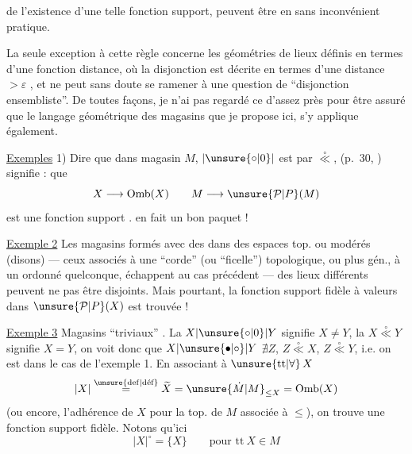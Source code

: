 de l'existence d'une telle fonction support, peuvent être  en  sans inconvénient pratique.

La seule exception à cette règle concerne les géométries de lieux définis  en termes d'une fonction distance, où la disjonction est décrite en termes d'une distance $>\varepsilon$ , et ne peut sans doute se ramener à une question de  ``disjonction ensembliste''. De toutes façons, je n'ai pas regardé ce  d'assez près pour être assuré que le langage géométrique des magasins que je propose ici, s'y applique également.

\uline{Exemples} 1)  Dire que dans  magasin $M$,  $\lvert\unsure{\circ|0}\rvert$ est  par $\overset{\circ}{\ll}$, (p.~30, ) signifie : que
\[
 X \longrightarrow \mathrm{Omb}(X) \qquad M \longrightarrow \unsure{\mathcal{P}|P}(M)
\]
est une fonction support .   en fait un bon paquet !



\uline{Exemple 2} Les magasins formés avec des   dans des espaces  top. ou modérés (disons) ---  ceux associés à une ``corde'' (ou ``ficelle'') topologique, ou plus gén., à un  ordonné quelconque, échappent au cas précédent --- des lieux différents peuvent ne pas être disjoints. Mais pourtant, la fonction support fidèle à valeurs dans $\unsure{\mathcal{P}|P}(X)$ est  trouvée !

\uline{Exemple 3} Magasins ``triviaux''  . La   $X\lvert\unsure{\circ|0}\rvert Y$ signifie $X\ne Y$, la   $X\overset{\circ}{\ll}Y$ signifie $X=Y$, on voit  donc que $X\lvert\unsure{\bullet|\circ}\rvert Y$  $\nexists Z$, $Z\overset{\circ}{\ll}X$, $Z\overset{\circ}{\ll}Y$, i.e. on est dans le cas de l'exemple 1. En associant à $\unsure{\text{tt}|\forall}\,X$
\[
 \lvert X\rvert\overset{\unsure{\mathrm{def}|\text{déf}}}{=}\widetilde{X}=\unsure{\dot M|M}_{\leq X}=\mathrm{Omb}(X)
\]
(ou encore, l'adhérence de $X$ pour la top. de $M$ associée à $\leq$), on trouve une fonction support fidèle. Notons qu'ici
\[
 \lvert X\rvert^{\circ}=\{X\} \qquad \text{pour tt}\ X\in M
\]

